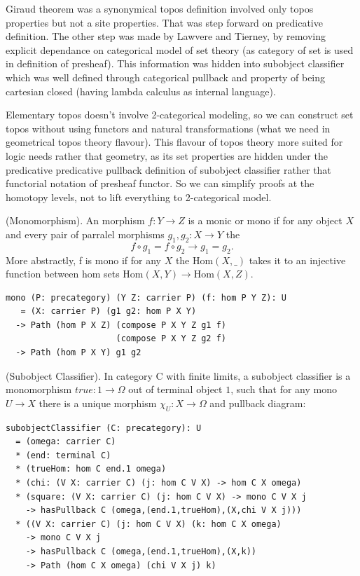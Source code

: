 \begin{definition}
Giraud theorem was a synonymical topos definition involved only topos
properties but not a site properties. That was step forward on
predicative definition. The other step was made by Lawvere and Tierney,
by removing explicit dependance on categorical model of set
theory (as category of set is used in definition of presheaf). This information
was hidden into subobject classifier which was well defined through
categorical pullback and property of being cartesian
closed (having lambda calculus as internal language).

Elementary topos doesn't involve 2-categorical modeling, so we can construct
set topos without using functors and natural transformations
(what we need in geometrical topos theory flavour). This flavour of topos
theory more suited for logic needs rather that geometry, as its set properties
are hidden under the predicative predicative pullback definition of subobject classifier
rather that functorial notation of presheaf functor. So we can simplify proofs
at the homotopy levels, not to lift everything to 2-categorical model.

\begin{definition} (Monomorphism).
An morphism $f : Y \rightarrow Z $ is a monic or mono
if for any object $X$ and every pair of parralel morphisms $g_1,g_2: X \rightarrow Y$ the
$$
    f \circ g_1 = f \circ g_2 \rightarrow g_1 = g_2.
$$
More abstractly, f is mono if for any $X$ the $\mathrm{Hom}(X,\_)$ takes it to an injective
function between hom sets $\mathrm{Hom}(X,Y) \rightarrow \mathrm{Hom}(X,Z)$.
\begin{lstlisting}
mono (P: precategory) (Y Z: carrier P) (f: hom P Y Z): U
   = (X: carrier P) (g1 g2: hom P X Y)
  -> Path (hom P X Z) (compose P X Y Z g1 f)
                      (compose P X Y Z g2 f)
  -> Path (hom P X Y) g1 g2
\end{lstlisting}
\end{definition}

\begin{definition} (Subobject Classifier\cite{Johnstone14}).
In category $\mathrm{C}$ with finite limits,
a subobject classifier is a monomorphism $true: 1 \rightarrow \Omega$ out of terminal
object $\mathrm{1}$, such that for any mono $U \rightarrow X$ there is a unique
morphism $\chi_U : X \rightarrow \Omega$ and pullback diagram:
\begin{lstlisting}
subobjectClassifier (C: precategory): U
  = (omega: carrier C)
  * (end: terminal C)
  * (trueHom: hom C end.1 omega)
  * (chi: (V X: carrier C) (j: hom C V X) -> hom C X omega)
  * (square: (V X: carrier C) (j: hom C V X) -> mono C V X j
    -> hasPullback C (omega,(end.1,trueHom),(X,chi V X j)))
  * ((V X: carrier C) (j: hom C V X) (k: hom C X omega)
    -> mono C V X j
    -> hasPullback C (omega,(end.1,trueHom),(X,k))
    -> Path (hom C X omega) (chi V X j) k)
\end{lstlisting}
\end{definition}


\end{definition}
